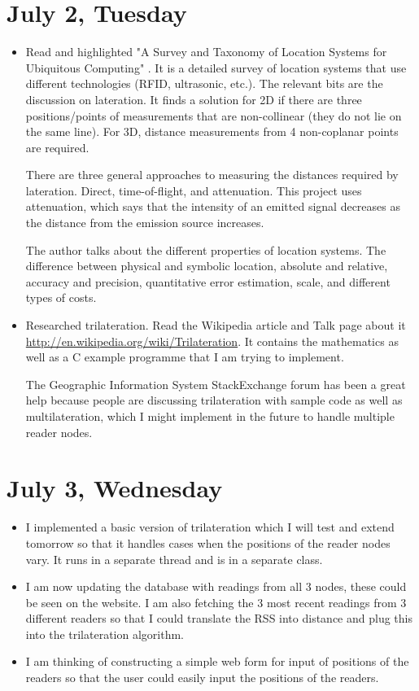 \documentclass[a4paper,12pt]{article}
\begin{document}
\section{July 2, Tuesday}

\begin{itemize}
	\item Read and highlighted "A Survey and Taxonomy of Location Systems for Ubiquitous Computing" \cite{Hightower2001c}. It is a detailed survey of location systems that use different technologies (RFID, ultrasonic, etc.). The relevant bits are the discussion on lateration. It finds a solution for 2D if there are three positions/points of measurements that are non-collinear (they do not lie on the same line). For 3D, distance measurements from 4 non-coplanar points are required.
	
	There are three general approaches to measuring the distances required by lateration. Direct, time-of-flight, and attenuation. This project uses attenuation, which says that the intensity of an emitted signal decreases as the distance from the emission source increases.
	
	The author talks about the different properties of location systems. The difference between physical and symbolic location, absolute and relative, accuracy and precision, quantitative error estimation, scale, and different types of costs.
	\item Researched trilateration. Read the Wikipedia article and Talk page about it \url{http://en.wikipedia.org/wiki/Trilateration}. It contains the mathematics as well as a C example programme that I am trying to implement.
	
	The Geographic Information System StackExchange forum has been a great help because people are discussing trilateration with sample code as well as multilateration, which I might implement in the future to handle multiple reader nodes.
\end{itemize}

\section{July 3, Wednesday}

\begin{itemize}
	\item I implemented a basic version of trilateration which I will test and extend tomorrow so that it handles cases when the positions of the reader nodes vary. It runs in a separate thread and is in a separate class.
	\item I am now updating the database with readings from all 3 nodes, these could be seen on the website. I am also fetching the 3 most recent readings from 3 different readers so that I could translate the RSS into distance and plug this into the trilateration algorithm.
	\item I am thinking of constructing a simple web form for input of positions of the readers so that the user could easily input the positions of the readers.
\end{itemize}
\end{document}
